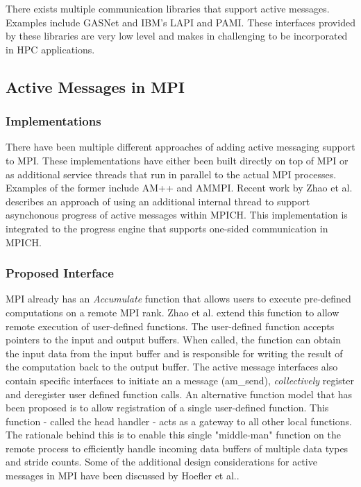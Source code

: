 
There exists multiple communication libraries that 
support active messages. Examples include 
GASNet\cite{gasnet} 
and IBM's LAPI\cite{lapi} and PAMI\cite{pami}. These interfaces provided 
by these libraries are very low level and makes in 
challenging to be incorporated in HPC 
applications.


\subsection{Active Messages in MPI}

\subsubsection{Implementations}
There have been multiple different approaches of 
adding active messaging support to MPI. These 
implementations have either been built directly on 
top of MPI or as additional service threads that 
run in parallel to the actual MPI processes. 
Examples of the former include 
AM++\cite{willcock2010amplus} and 
AMMPI\cite{bonacheaammpi}. 
Recent work by Zhao et al. describes an approach 
of using an additional internal thread to support 
asynchonous progress of active messages within 
MPICH\cite{zhao2013toward}. This implementation is 
integrated to the progress engine that supports 
one-sided communication in MPICH.

\subsubsection{Proposed Interface}
MPI already has an \textit{Accumulate} function 
that allows users to execute pre-defined 
computations on a remote MPI rank. Zhao et al.  
extend this function to allow remote execution of 
user-defined functions. The user-defined function 
accepts pointers to the input and output buffers.  
When called, the function can obtain the input 
data from the input buffer and is responsible for 
writing the result of the computation back to the 
output buffer. The active message interfaces also 
contain specific interfaces to initiate an a 
message (am\_send), \textit{collectively} register 
and deregister user defined function calls. An 
alternative function model that has been proposed 
is to allow registration of a single user-defined 
function. This function - called the head handler 
- acts as a gateway to all other local functions.  
The rationale behind this is to enable this single 
"middle-man" function on the remote process to 
efficiently handle incoming data buffers of 
multiple data types and stride counts. Some of the 
additional design considerations for active 
messages in MPI have been discussed by Hoefler et 
al.\cite{hoefler2009active}.


